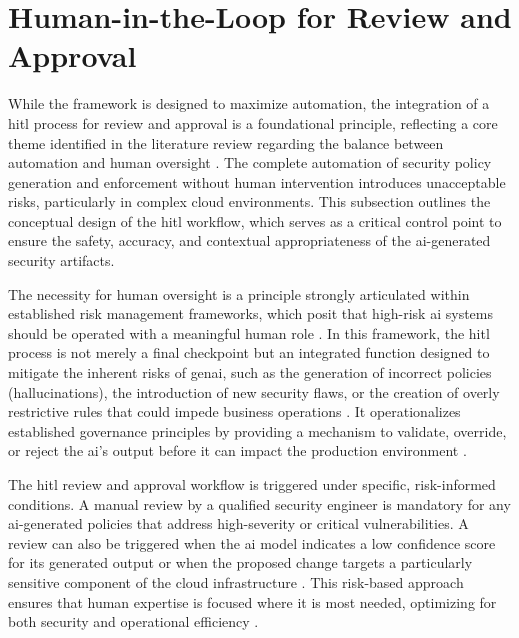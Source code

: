 
\section{Human-in-the-Loop for Review and Approval} %
\label{sub:Human-in-the-Loop for Review and Approval}

While the framework is designed to maximize automation, the integration of a \gls{hitl} process for review and approval is a foundational principle, reflecting a core theme identified in the literature review regarding the balance between automation and human oversight  \cite{nicosia_risk_nodate}. The complete automation of security policy generation and enforcement without human intervention introduces unacceptable risks, particularly in complex cloud environments. This subsection outlines the conceptual design of the \gls{hitl} workflow, which serves as a critical control point to ensure the safety, accuracy, and contextual appropriateness of the \gls{ai}-generated security artifacts.

The necessity for human oversight is a principle strongly articulated within established risk management frameworks, which posit that high-risk \gls{ai} systems should be operated with a meaningful human role \cite{nicosia_risk_nodate}. In this framework, the \gls{hitl} process is not merely a final checkpoint but an integrated function designed to mitigate the inherent risks of \gls{genai}, such as the generation of incorrect policies (hallucinations), the introduction of new security flaws, or the creation of overly restrictive rules that could impede business operations  \cite{nicosia_risk_nodate}. It operationalizes established governance principles by providing a mechanism to validate, override, or reject the \gls{ai}'s output before it can impact the production environment \cite{noauthor_human---loop_nodate}.

The \gls{hitl} review and approval workflow is triggered under specific, risk-informed conditions. A manual review by a qualified security engineer is mandatory for any \gls{ai}-generated policies that address high-severity or critical vulnerabilities. A review can also be triggered when the \gls{ai} model indicates a low confidence score for its generated output or when the proposed change targets a particularly sensitive component of the cloud infrastructure \cite{nicosia_risk_nodate}. This risk-based approach ensures that human expertise is focused where it is most needed, optimizing for both security and operational efficiency \cite{noauthor_human---loop_nodate}.

